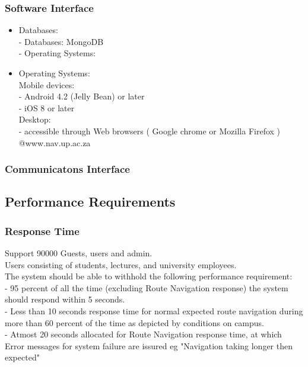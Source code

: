 \documentclass[a4paper,12pt]{report}
\begin{document}
	\subsubsection{Software Interface}
		\begin{itemize}
			\item Databases: \\
			- Databases: MongoDB \\
			- Operating Systems:  \\
			
			\item Operating Systems: \\
			Mobile devices: \\
			- Android 4.2 (Jelly Bean) or later \\
			- iOS 8 or later \\
			
			Desktop:\\
			- accessible through Web browsers ( Google chrome or Mozilla Firefox ) @www.nav.up.ac.za 
			
			
		\end{itemize}
		
		
		 
	\subsubsection{Communicatons Interface}
\newpage
\subsection{Performance Requirements}
	
		\subsubsection{Response Time}
		Support 90000 Guests, users and admin.\\
		Users consisting of students, lectures, and university employees.\\
		The system should be able to withhold the following performance requirement:\\
		- 95 percent of all the time (excluding Route Navigation response) the system should respond within 5 seconds.\\
		- Less than 10 seconds response time for normal expected route navigation during more than 60 percent of the 
		time as depicted by conditions on campus.\\
		- Atmost 20 seconds allocated for Route Navigation response time, at which Error messages for system failure are
		issured eg "Navigation taking longer then expected"
		
\end{document}
